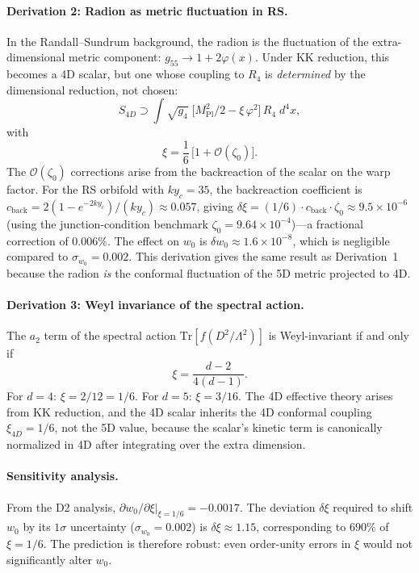\paragraph{Derivation 2: Radion as metric fluctuation in RS.}
In the Randall--Sundrum background, the radion is the fluctuation of the extra-dimensional metric component: $g_{55} \to 1 + 2\varphi(x)$. Under KK reduction, this becomes a 4D scalar, but one whose coupling to $R_4$ is \emph{determined} by the dimensional reduction, not chosen:
\begin{equation}
  S_{4D} \supset \int \sqrt{g_4}\;\bigl[M_{\mathrm{Pl}}^2/2 - \xi\, \varphi^2\bigr]\, R_4\; d^4x,
  \label{eq:4-71}
\end{equation}
with
\begin{equation}
  \xi = \frac{1}{6}\,\bigl[1 + \mathcal{O}(\zeta_0)\bigr].
  \label{eq:4-72}
\end{equation}
The $\mathcal{O}(\zeta_0)$ corrections arise from the backreaction of the scalar on the warp factor. For the RS orbifold with $ky_c = 35$, the backreaction coefficient is $c_{\mathrm{back}} = 2(1 - e^{-2ky_c})/(ky_c) \approx 0.057$, giving $\delta\xi = (1/6) \cdot c_{\mathrm{back}} \cdot \zeta_0 \approx 9.5 \times 10^{-6}$ (using the junction-condition benchmark $\zeta_0 = 9.64 \times 10^{-4}$)---a fractional correction of $0.006\%$. The effect on $w_0$ is $\delta w_0 \approx 1.6 \times 10^{-8}$, which is negligible compared to $\sigma_{w_0} = 0.002$. This derivation gives the same result as Derivation~1 because the radion \emph{is} the conformal fluctuation of the 5D metric projected to 4D.

\paragraph{Derivation 3: Weyl invariance of the spectral action.}
The $a_2$ term of the spectral action $\mathrm{Tr}[f(D^2/\Lambda^2)]$ is Weyl-invariant if and only if
\begin{equation}
  \xi = \frac{d-2}{4(d-1)}.
  \label{eq:4-73}
\end{equation}
For $d = 4$: $\xi = 2/12 = 1/6$. For $d = 5$: $\xi = 3/16$. The 4D effective theory arises from KK reduction, and the 4D scalar inherits the 4D conformal coupling $\xi_{4D} = 1/6$, not the 5D value, because the scalar's kinetic term is canonically normalized in 4D after integrating over the extra dimension.

\paragraph{Sensitivity analysis.}
From the D2 analysis, $\partial w_0 / \partial \xi \big|_{\xi = 1/6} = -0.0017$. The deviation $\delta\xi$ required to shift $w_0$ by its $1\sigma$ uncertainty ($\sigma_{w_0} = 0.002$) is $\delta\xi \approx 1.15$, corresponding to $690\%$ of $\xi = 1/6$. The prediction is therefore robust: even order-unity errors in $\xi$ would not significantly alter $w_0$.

